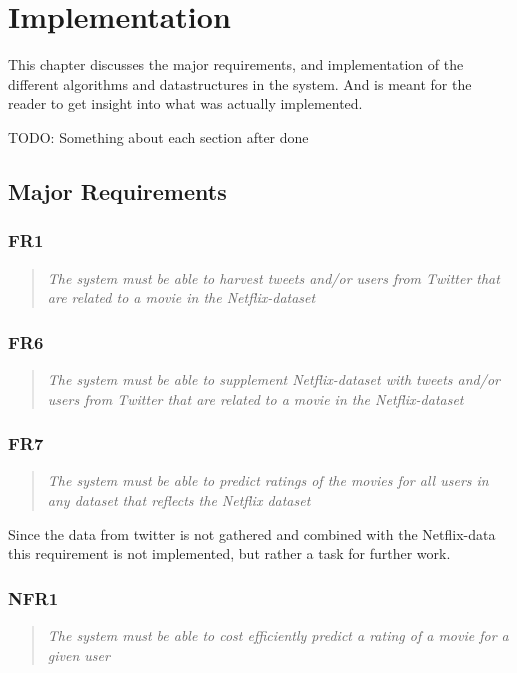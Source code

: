 
\chapter{Implementation}

\minitoc

This chapter discusses the major requirements, and implementation of the different algorithms and datastructures in the system. And is meant for the reader to get insight into what was actually implemented.

TODO: Something about each section after done
\clearpage

\section{Major Requirements}\label{impl:Major Requirements}
\subsection{FR1}
\begin{quotation}
\em The system must be able to harvest tweets and/or users from Twitter that are related to a movie in the Netflix-dataset %
\end{quotation}

\subsection{FR6}
\begin{quotation}
\em The system must be able to supplement Netflix-dataset with tweets and/or users from Twitter that are related to a movie in the Netflix-dataset %
\end{quotation}

\subsection{FR7}
\begin{quotation}
\em The system must be able to predict ratings of the movies for all users in any dataset that reflects the Netflix dataset %
\end{quotation}

Since the data from twitter is not gathered and combined with the Netflix-data this requirement is not implemented, but rather a task for further work.

\subsection{NFR1}
\begin{quotation}
\em The system must be able to cost efficiently predict a rating of a movie for a given user %
\end{quotation}


